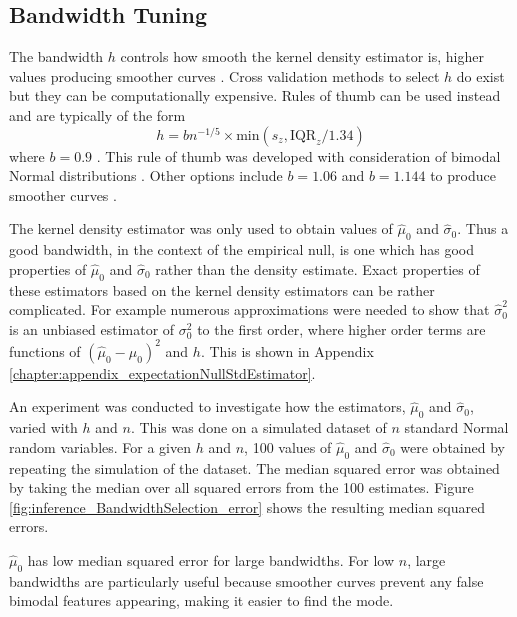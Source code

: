 \subsection{Bandwidth Tuning}

The bandwidth $h$ controls how smooth the kernel density estimator is, higher values producing smoother curves \citep{friedman2001elements}. Cross validation methods to select $h$ do exist \citep{bowman1984alternative, sheather2004density} but they can be computationally expensive. Rules of thumb \citep{silverman1986density, sheather2004density} can be used instead and are typically of the form
\begin{equation}
  h = bn^{-1/5}\times\text{min}\left(s_z,\text{IQR}_z/1.34\right)
\end{equation}
where $b=0.9$ \citep{silverman1986density}. This rule of thumb was developed with consideration of bimodal Normal distributions \citep{silverman1986density}. Other options include $b=1.06$ and $b=1.144$ to produce smoother curves \citep{silverman1986density, sheather2004density}.

The kernel density estimator was only used to obtain values of $\widehat{\mu}_0$ and $\widehat{\sigma}_0$. Thus a good bandwidth, in the context of the empirical null, is one which has good properties of $\widehat{\mu}_0$ and $\widehat{\sigma}_0$ rather than the density estimate. Exact properties of these estimators based on the kernel density estimators can be rather complicated. For example numerous approximations were needed to show that $\widehat{\sigma}_0^2$ is an unbiased estimator of $\sigma_0^2$ to the first order, where higher order terms are functions of $(\widehat{\mu}_0 - \mu_0)^2$ and $h$. This is shown in Appendix \ref{chapter:appendix_expectationNullStdEstimator}.

An experiment was conducted to investigate how the estimators, $\widehat{\mu}_0$ and $\widehat{\sigma}_0$, varied with $h$ and $n$. This was done on a simulated dataset of $n$ standard Normal random variables. For a given $h$ and $n$, 100 values of $\widehat{\mu}_0$ and $\widehat{\sigma}_0$ were obtained by repeating the simulation of the dataset. The median squared error was obtained by taking the median over all squared errors from the 100 estimates. Figure \ref{fig:inference_BandwidthSelection_error} shows the resulting median squared errors.

$\widehat{\mu}_0$ has low median squared error for large bandwidths. For low $n$, large bandwidths are particularly useful because smoother curves prevent any false bimodal features appearing, making it easier to find the mode.

